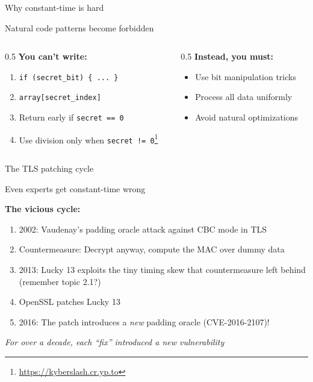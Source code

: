 \ifdefined\PRESENTATION\else\PassOptionsToClass{handout}{beamer}\fi\documentclass[aspectratio=169, lualatex]{beamer}
\begin{document}
\begin{frame}{Why constant-time is hard}
	\begin{center}
		\Large
		Natural code patterns become forbidden
	\end{center}
	\begin{columns}[t]
		\begin{column}{0.5\textwidth}
			\textbf{You can't write:}
			\begin{enumerate}
				\item \texttt{if (secret\_bit) \{ ... \}}
				\item \texttt{array[secret\_index]}
				\item Return early if \texttt{secret == 0}
				\item Use division only when \texttt{secret != 0}\footnote{\url{https://kyberslash.cr.yp.to}}
			\end{enumerate}
		\end{column}
		\begin{column}{0.5\textwidth}
			\textbf{Instead, you must:}
			\begin{itemize}
				\item Use bit manipulation tricks
				\item Process all data uniformly
				\item Avoid natural optimizations
			\end{itemize}
		\end{column}
	\end{columns}
\end{frame}

\begin{frame}{The TLS patching cycle}
	\begin{center}
		\Large
		Even experts get constant-time wrong
	\end{center}
	\vspace{0.5em}
	\textbf{The vicious cycle:}
	\begin{enumerate}
		\item 2002: Vaudenay's padding oracle attack against CBC mode in TLS
		\item Countermeasure: Decrypt anyway, compute the MAC over dummy data
		\item 2013: Lucky 13 exploits the tiny timing skew that countermeasure left behind (remember topic 2.1?)
		\item OpenSSL patches Lucky 13
		\item 2016: The patch introduces a \textit{new} padding oracle (CVE-2016-2107)!
	\end{enumerate}
	\vspace{0.5em}
	\begin{center}
		\textit{For over a decade, each ``fix'' introduced a new vulnerability}
	\end{center}
\end{frame}
\end{document}
